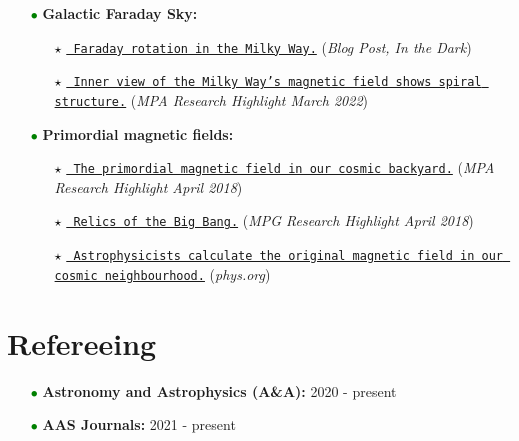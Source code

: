 \documentclass[11pt,a4paper,sans, table, dvipsnames]{moderncv}        %
\begin{document}
\begin{itemize}
  \item[\textcolor{Green}{$\bullet$}] \textbf{Galactic Faraday Sky:}
  \vspace{0.2\baselineskip}
  \begin{itemize}
    \item[\textcolor{Black}{$\star$}]
    \href{https://telescoper.wordpress.com/tag/faraday-rotation/}{\texttt{{\color{blue} Faraday rotation in the Milky Way.}}} (\textit{Blog Post, In the Dark})
    \item[\textcolor{Black}{$\star$}]
    \href{https://www.mpa-garching.mpg.de/1050627/hl202203}{\texttt{{\color{blue} Inner view of the Milky Way’s magnetic field shows spiral structure.}}} (\textit{MPA Research Highlight March 2022})
  \end{itemize}
  \vspace{0.4\baselineskip}
  \item[\textcolor{Green}{$\bullet$}] \textbf{Primordial magnetic fields:}
  \vspace{0.2\baselineskip}
  \begin{itemize}
    \item[\textcolor{Black}{$\star$}]
    \href{https://www.mpa-garching.mpg.de/498249/hl201804}{\texttt{{\color{blue} The primordial magnetic field in our cosmic backyard.}}}
    (\textit{MPA Research Highlight April 2018})
    \item[\textcolor{Black}{$\star$}]
    \href{https://www.mpg.de/11991394/relics-of-the-big-bang}{\texttt{{\color{blue} Relics of the Big Bang.}}} (\textit{MPG Research Highlight April 2018})
    \item[\textcolor{Black}{$\star$}]
    \href{https://phys.org/news/2018-04-astrophysicists-magnetic-field-cosmic-neighbourhood.html}{\texttt{{\color{blue} Astrophysicists calculate the original magnetic field in our cosmic neighbourhood.}}} (\textit{phys.org})
  \end{itemize}
\end{itemize}

\vspace{\baselineskip}
\section{Refereeing}
\begin{itemize}
\item[\textcolor{Green}{$\bullet$}] \textbf{Astronomy and Astrophysics (A\&A):} 2020 - present
\item[\textcolor{Green}{$\bullet$}] \textbf{AAS Journals:} 2021 - present
\end{itemize}
\end{document}
